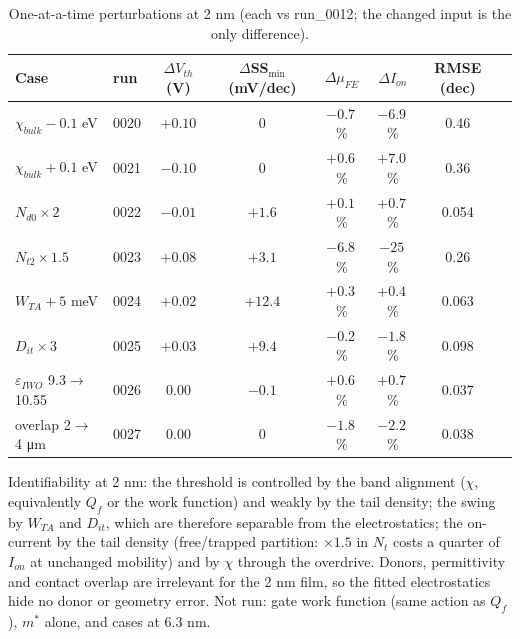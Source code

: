\documentclass[11pt,a4paper]{article}
\newcommand{\um}{\si{\micro\metre}}
\begin{document}
\begin{table}[H]\centering\footnotesize
\caption{One-at-a-time perturbations at 2 nm (each vs run\_0012; the changed input is the only difference).}
\begin{tabular}{llcccccc}\toprule
Case & run & $\Delta V_{th}$ (V) & $\Delta$SS$_{\min}$ (mV/dec) & $\Delta\mu_{FE}$ & $\Delta I_{on}$ & RMSE (dec)\\\midrule
$\chi_{bulk}-0.1$ eV & 0020 & $+0.10$ & 0 & $-0.7$\,\% & $-6.9$\,\% & 0.46\\
$\chi_{bulk}+0.1$ eV & 0021 & $-0.10$ & 0 & $+0.6$\,\% & $+7.0$\,\% & 0.36\\
$N_{d0}\times2$ & 0022 & $-0.01$ & $+1.6$ & $+0.1$\,\% & $+0.7$\,\% & 0.054\\
$N_{t2}\times1.5$ & 0023 & $+0.08$ & $+3.1$ & $-6.8$\,\% & $-25$\,\% & 0.26\\
$W_{TA}+5$ meV & 0024 & $+0.02$ & $+12.4$ & $+0.3$\,\% & $+0.4$\,\% & 0.063\\
$D_{it}\times3$ & 0025 & $+0.03$ & $+9.4$ & $-0.2$\,\% & $-1.8$\,\% & 0.098\\
$\varepsilon_{IWO}$ 9.3$\to$10.55 & 0026 & 0.00 & $-0.1$ & $+0.6$\,\% & $+0.7$\,\% & 0.037\\
overlap 2$\to$4 \um & 0027 & 0.00 & 0 & $-1.8$\,\% & $-2.2$\,\% & 0.038\\
\bottomrule\end{tabular}
\end{table}
Identifiability at 2 nm: the threshold is controlled by the band alignment ($\chi$, equivalently $Q_f$ or the work function) and weakly by the tail density; the swing by $W_{TA}$ and $D_{it}$, which are therefore separable from the electrostatics; the on-current by the tail density (free/trapped partition: $\times1.5$ in $N_t$ costs a quarter of $I_{on}$ at unchanged mobility) and by $\chi$ through the overdrive. Donors, permittivity and contact overlap are irrelevant for the 2 nm film, so the fitted electrostatics hide no donor or geometry error. Not run: gate work function (same action as $Q_f$), $m^*$ alone, and cases at 6.3 nm.

\end{document}
